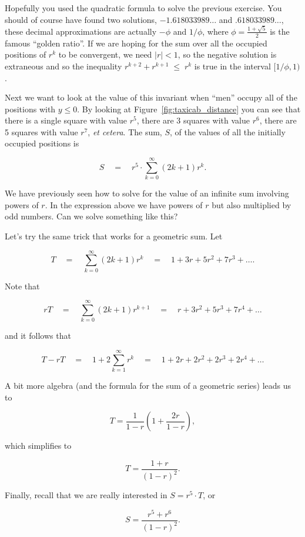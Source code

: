 Hopefully you used the quadratic formula to solve the previous 
exercise.  You should of course have found two solutions, $-1.618033989\ldots$
and $.618033989\ldots$, these decimal approximations are actually $-\phi$ and $1/\phi$, where $\displaystyle \phi = \frac{1+\sqrt{5}}{2}$ is the famous  ``golden ratio''.   If we are hoping for the sum over all the occupied positions of $r^k$ to be convergent, we need $|r|<1$, so the negative 
solution is extraneous and so the inequality  $r^{k+2} + r^{k+1} \; \leq \; r^k$
is true in the interval $[1/\phi, 1)$.

Next we want to look at the value of this invariant when ``men'' occupy all of
the positions with $y\leq0$.  By looking at Figure~\ref{fig:taxicab_distance}
you can see that there is a single square with value $r^5$,  there are 3 squares
with value $r^6$, there are 5 squares with value $r^7$, \emph{et cetera}.
The sum, $S$, of the values of all the initially occupied positions is

\[ S \quad = \quad r^5 \cdot \sum_{k=0}^{\infty} (2k+1) r^k. \]

We have previously seen how to solve for the value of an infinite sum involving
powers of $r$.  In the expression above we have powers of $r$ but also 
multiplied by odd numbers.  Can we solve something like this?

Let's try the same trick that works for a geometric sum.  Let

\[ T \quad = \quad  \sum_{k=0}^{\infty} (2k+1) r^k \quad = \quad  1 + 3r + 5r^2 + 7r^3 + \ldots. \]

Note that 

\[ rT \quad = \quad  \sum_{k=0}^{\infty} (2k+1) r^{k+1} \quad = \quad  r + 3r^2 + 5r^3 + 7r^4 + \ldots \]

\noindent and it follows that 

\[ T - rT \quad = \quad  1 + 2 \sum_{k=1}^{\infty} r^{k} \quad = \quad 1 + 2r + 2r^2 + 2r^3 + 2r^4 + \ldots \]

A bit more algebra (and the formula for the sum of a geometric series) leads us to

\[ T = \frac{1}{1-r}\left( 1 + \frac{2r}{1-r} \right), \]

\noindent

which simplifies to 

\[ T = \frac{1+r}{(1-r)^2}. \]

Finally, recall that we are really interested in $S = r^5 \cdot T$, or

\[ S = \frac{r^5 + r^6}{(1-r)^2}. \]

